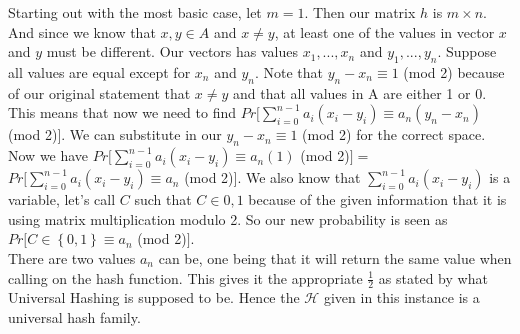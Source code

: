 \documentclass[11pt]{article}
\begin{document}
Starting out with the most basic case, let $m = 1$. Then our matrix $h$ is $m \times n$. And since we know that $x, y \in A$ and $x \neq y$, at least one of the values in vector $x$ and $y$ must be different. Our vectors has values $x_1, ..., x_n$ and $y_1, ..., y_n$. Suppose all values are equal except for $x_n$ and $y_n$. Note that $y_n - x_n \equiv 1$ (mod 2) because of our original statement that $x \neq y$ and that all values in A are either 1 or 0. \\

This means that now we need to find $Pr[\sum_{i = 0}^{n-1} a_i(x_i - y_i) \equiv a_n(y_n - x_n)$ (mod 2)$]$. We can substitute in our $y_n - x_n \equiv 1$ (mod 2) for the correct space. \\

Now we have $Pr[\sum_{i = 0}^{n-1} a_i(x_i - y_i) \equiv a_n(1)$ (mod 2)$] = $ $Pr[\sum_{i = 0}^{n-1} a_i(x_i - y_i) \equiv a_n$ (mod 2)$]$. We also know that $\sum_{i = 0}^{n-1} a_i(x_i - y_i)$ is a variable, let's call $C$ such that $C \in {0,1}$ because of the given information that it is using matrix multiplication modulo 2. So our new probability is seen as $Pr[C\in \left\{0,1\right\} \equiv a_n$ (mod 2)$]$. \\

There are two values $a_n$ can be, one being that it will return the same value when calling on the hash function. This gives it the appropriate $\frac{1}{2}$ as stated by what Universal Hashing is supposed to be. Hence the $\mathcal{H}$ given in this instance is a universal hash family.


\newpage
\end{document}
